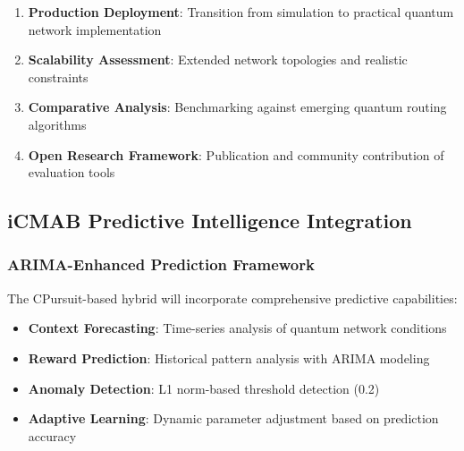 \documentclass[12pt,a4paper]{article}
\begin{document}
\begin{enumerate}
\item \textbf{Production Deployment}: Transition from simulation to practical quantum network implementation
\item \textbf{Scalability Assessment}: Extended network topologies and realistic constraints
\item \textbf{Comparative Analysis}: Benchmarking against emerging quantum routing algorithms
\item \textbf{Open Research Framework}: Publication and community contribution of evaluation tools
\end{enumerate}

\subsection{iCMAB Predictive Intelligence Integration}

\subsubsection{ARIMA-Enhanced Prediction Framework}

The CPursuit-based hybrid will incorporate comprehensive predictive capabilities:

\begin{itemize}
\item \textbf{Context Forecasting}: Time-series analysis of quantum network conditions
\item \textbf{Reward Prediction}: Historical pattern analysis with ARIMA modeling
\item \textbf{Anomaly Detection}: L1 norm-based threshold detection (0.2)
\item \textbf{Adaptive Learning}: Dynamic parameter adjustment based on prediction accuracy
\end{itemize}
\end{document}
